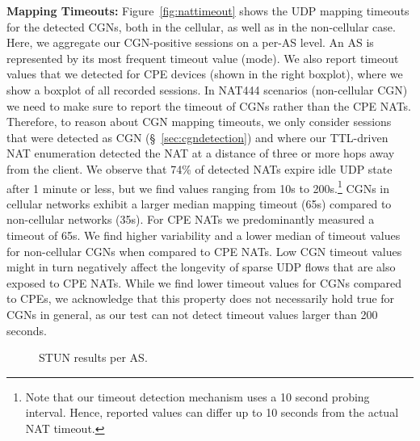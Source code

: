 \documentclass[10pt]{sig-alternate-05-2015}
\newcommand\xref[1]{\S~\ref{#1}}
\newcommand{\parax}[1]{\vspace{0.2em} \noindent \textbf{#1:}}
\begin{document}
\parax{Mapping Timeouts}
Figure~\ref{fig:nattimeout} shows the UDP mapping timeouts for the 
detected CGNs, both in the cellular, as well as in the non-cellular case. Here, 
we aggregate our CGN-positive sessions on a per-AS level. An AS is 
represented by its most frequent timeout value (mode).
We also report timeout values that we detected for CPE devices (shown in the 
right boxplot), where we show a boxplot of all recorded sessions. In NAT444 
scenarios (non-cellular CGN) we need to make sure to report the timeout of CGNs 
rather than the CPE NATs. Therefore, to reason about CGN mapping timeouts, we 
only consider sessions that were detected as CGN (\xref{sec:cgndetection}) and 
where our TTL-driven NAT enumeration detected the NAT at a distance of three or 
more hops away from the client.
We observe that 74\%{} of detected NATs expire idle UDP 
state after 1 minute or less, but we find values ranging from 10s to 
200s.\footnote{Note that our timeout detection mechanism uses a 10 second 
probing interval. Hence, reported values can differ up to 10 seconds from the 
actual NAT timeout.}
CGNs in cellular networks exhibit a larger median mapping timeout 
(65{}s) compared to non-cellular networks 
(35{}s). For CPE NATs we predominantly measured 
a timeout of 65{}s. We find higher variability and 
a lower median of timeout values for non-cellular CGNs when compared to CPE 
NATs. Low CGN timeout values might in turn negatively affect the longevity of 
sparse UDP flows that are also exposed to CPE NATs. While we find lower timeout 
values for CGNs compared to CPEs, we acknowledge that this property does not 
necessarily hold true for CGNs in general, as our test can not detect timeout 
values larger than 200 seconds.

\begin{figure}
  \begin{center}
\caption{STUN results per AS.}
  \vspace{-1em}
  \label{fig:stun}
  \end{center}
\end{figure}
\end{document}
